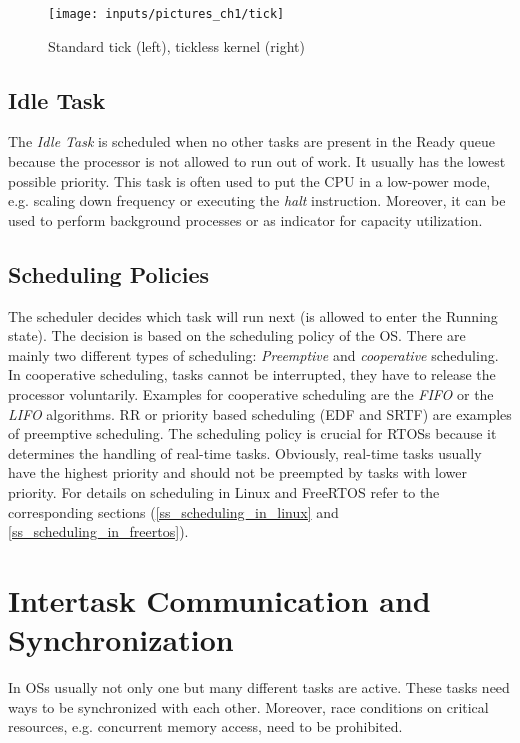 \begin{figure}[htb]
	\begin{center}
		\texttt{[image: inputs/pictures\_ch1/tick]}
		\caption[Standard and tickless kernel]{Standard tick (left), tickless kernel (right) \cite{barry:ftssp}} \label{fig_tick}
	\end{center}
\end{figure}

\subsection{Idle Task}
The \textit{Idle Task} is scheduled when no other tasks are present in the Ready queue because the processor is not allowed to run out of work.
It usually has the lowest possible priority.
This task is often used to put the \ac{CPU} in a low-power mode, e.g. scaling down frequency or executing the \textit{halt} instruction. 
Moreover, it can be used to perform background processes or as indicator for capacity utilization.  
  
\subsection{Scheduling Policies}\label{ss_scheduling_policy} 
The scheduler decides which task will run next (is allowed to enter the Running state). 
The decision is based on the scheduling policy of the \ac{OS}.
There are mainly two different types of scheduling: \textit{Preemptive} and \textit{cooperative} scheduling.
In cooperative scheduling, tasks cannot be interrupted, they have to release the processor voluntarily. 
Examples for cooperative scheduling are the \textit{\ac{FIFO}} or the \textit{\ac{LIFO}} algorithms.
\ac{RR} or priority based scheduling (\ac{EDF} and \ac{SRTF}) are examples of preemptive scheduling.
The scheduling policy is crucial for \acp{RTOS} because it determines the handling of real-time tasks.
Obviously, real-time tasks usually have the highest priority and should not be preempted by tasks with lower priority.
For details on scheduling in Linux and FreeRTOS refer to the corresponding sections (\ref{ss_scheduling_in_linux} and \ref{ss_scheduling_in_freertos}).

\section{Intertask Communication and Synchronization}\label{s_intertask_communication}
In \acp{OS} usually not only one but many different tasks are active.
These tasks need ways to be synchronized with each other.
Moreover, race conditions on critical resources, e.g. concurrent memory access, need to be prohibited.

